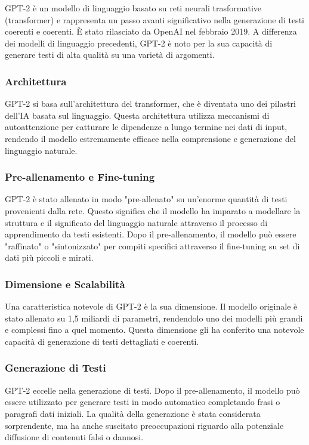 GPT-2 è un modello di linguaggio basato su reti neurali trasformative (transformer) e rappresenta un passo avanti significativo nella generazione di testi coerenti e coerenti. È stato rilasciato da OpenAI nel febbraio 2019. A differenza dei modelli di linguaggio precedenti, GPT-2 è noto per la sua capacità di generare testi di alta qualità su una varietà di argomenti.

\subsubsection{Architettura}
GPT-2 si basa sull'architettura del transformer, che è diventata uno dei pilastri dell'IA basata sul linguaggio. Questa architettura utilizza meccanismi di autoattenzione per catturare le dipendenze a lungo termine nei dati di input, rendendo il modello estremamente efficace nella comprensione e generazione del linguaggio naturale.

\subsubsection{Pre-allenamento e Fine-tuning}
GPT-2 è stato allenato in modo "pre-allenato" su un'enorme quantità di testi provenienti dalla rete. Questo significa che il modello ha imparato a modellare la struttura e il significato del linguaggio naturale attraverso il processo di apprendimento da testi esistenti. Dopo il pre-allenamento, il modello può essere "raffinato" o "sintonizzato" per compiti specifici attraverso il fine-tuning su set di dati più piccoli e mirati.

\subsubsection{Dimensione e Scalabilità}
Una caratteristica notevole di GPT-2 è la sua dimensione. Il modello originale è stato allenato su 1,5 miliardi di parametri, rendendolo uno dei modelli più grandi e complessi fino a quel momento. Questa dimensione gli ha conferito una notevole capacità di generazione di testi dettagliati e coerenti.

\subsubsection{Generazione di Testi}
GPT-2 eccelle nella generazione di testi. Dopo il pre-allenamento, il modello può essere utilizzato per generare testi in modo automatico completando frasi o paragrafi dati iniziali. La qualità della generazione è stata considerata sorprendente, ma ha anche suscitato preoccupazioni riguardo alla potenziale diffusione di contenuti falsi o dannosi.

